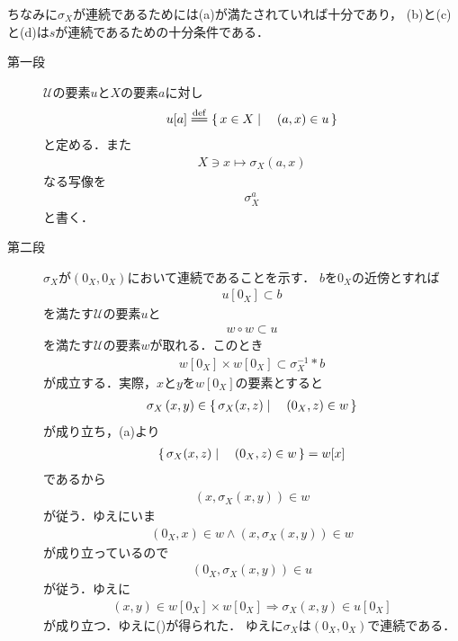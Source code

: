 	ちなみに$\sigma_X$が連続であるためには(a)が満たされていれば十分であり，
	(b)と(c)と(d)は$s$が連続であるための十分条件である．
	
	\begin{sketch}\mbox{}
		\begin{description}
			\item[第一段] $\mathscr{U}$の要素$u$と$X$の要素$a$に対し
				\begin{align}
					u[a] \defeq \Set{x \in X}{(a,x) \in u}
				\end{align}
				と定める．また
				\begin{align}
					X \ni x \longmapsto \sigma_X(a,x)
				\end{align}
				なる写像を
				\begin{align}
					\sigma_X^a
				\end{align}
				と書く．
				
			\item[第二段]
				$\sigma_X$が$\left(0_X,0_X\right)$において連続であることを示す．
				$b$を$0_X$の近傍とすれば
				\begin{align}
					u[0_X] \subset b
				\end{align}
				を満たす$\mathscr{U}$の要素$u$と
				\begin{align}
					w \circ w \subset u
				\end{align}
				を満たす$\mathscr{U}$の要素$w$が取れる．このとき
				\begin{align}
					w[0_X] \times w[0_X] \subset \sigma_X^{-1} \ast b
					\label{fom:thm_entourages_introducing_vector_topology_1}
				\end{align}
				が成立する．実際，$x$と$y$を$w[0_X]$の要素とすると
				\begin{align}
					\sigma_X\left(x,y\right) \in \left\{\, \sigma_X(x,z) \mid \quad (0_X,z) \in w\, \right\}
				\end{align}
				が成り立ち，(a)より
				\begin{align}
					\left\{\, \sigma_X(x,z) \mid \quad (0_X,z) \in w\, \right\} = w[x]
				\end{align}
				であるから
				\begin{align}
					\left(x,\sigma_X\left(x,y\right)\right) \in w
				\end{align}
				が従う．ゆえにいま
				\begin{align}
					(0_X,x) \in w \wedge \left(x,\sigma_X\left(x,y\right)\right) \in w
				\end{align}
				が成り立っているので
				\begin{align}
					\left(0_X,\sigma_X\left(x,y\right)\right) \in u
				\end{align}
				が従う．ゆえに
				\begin{align}
					\left(x,y\right) \in w[0_X] \times w[0_X] \Longrightarrow
					\sigma_X\left(x,y\right) \in u[0_X]
				\end{align}
				が成り立つ．ゆえに()が得られた．
				ゆえに$\sigma_X$は$\left(0_X,0_X\right)$で連続である．
				

\end{description}
\end{sketch}
